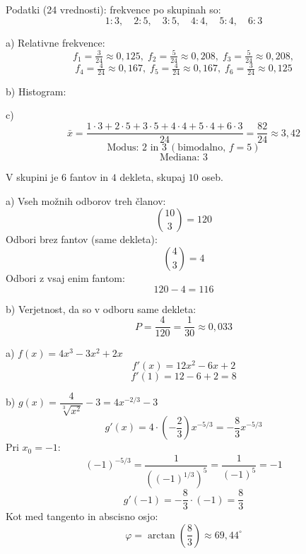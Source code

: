 \documentclass[a4paper,12pt]{letter}
\begin{document}
\newpage

\begin{resitev}

Podatki (24 vrednosti): frekvence po skupinah so:
\[
1:3,\quad 2:5,\quad 3:5,\quad 4:4,\quad 5:4,\quad 6:3
\]

a) Relativne frekvence:
\[
f_1=\tfrac{3}{24}\approx0{,}125,\; f_2=\tfrac{5}{24}\approx0{,}208,\; f_3=\tfrac{5}{24}\approx0{,}208,
\]
\[
f_4=\tfrac{4}{24}\approx0{,}167,\; f_5=\tfrac{4}{24}\approx0{,}167,\; f_6=\tfrac{3}{24}\approx0{,}125
\]

b) Histogram:
\begin{center}
\end{center}

c)
\[
\bar{x}=\frac{1\cdot3+2\cdot5+3\cdot5+4\cdot4+5\cdot4+6\cdot3}{24}=\frac{82}{24}\approx3{,}42
\]
\[
\text{Modus: }2 \text{ in } 3 \ (\text{bimodalno, } f=5)
\]
\[
\text{Mediana: }3
\]
\end{resitev}

\newpage

\begin{resitev}

V skupini je $6$ fantov in $4$ dekleta, skupaj $10$ oseb.

a) Vseh možnih odborov treh članov:
\[
\binom{10}{3}=120
\]
Odbori brez fantov (same dekleta):
\[
\binom{4}{3}=4
\]
Odbori z vsaj enim fantom:
\[
120-4=116
\]

b) Verjetnost, da so v odboru same dekleta:
\[
P=\frac{4}{120}=\frac{1}{30}\approx0{,}033
\]
\end{resitev}

\vspace{0.5cm}

\begin{resitev}

a) $f(x)=4x^3-3x^2+2x$
\[
f'(x)=12x^2-6x+2
\]
\[
f'(1)=12-6+2=8
\]

b) $g(x)=\dfrac{4}{\sqrt[3]{x^2}}-3=4x^{-2/3}-3$
\[
g'(x)=4\cdot\left(-\frac{2}{3}\right)x^{-5/3}=-\frac{8}{3}x^{-5/3}
\]
Pri $x_0=-1$:
\[
(-1)^{-5/3}=\frac{1}{\left((-1)^{1/3}\right)^5}=\frac{1}{(-1)^5}=-1
\]
\[
g'(-1)=-\frac{8}{3}\cdot(-1)=\frac{8}{3}
\]
Kot med tangento in abscisno osjo:
\[
\varphi=\arctan\!\left(\frac{8}{3}\right)\approx 69{,}44^\circ
\]
\end{resitev}
\end{document}
